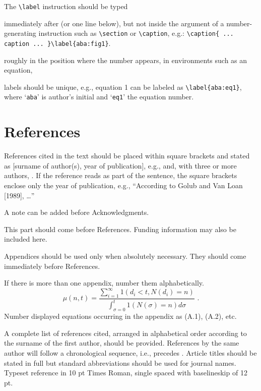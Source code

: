 \documentclass{ws-ijbc}
\begin{document}
The \verb|\label| instruction should be typed
\begin{itemlist}
\item immediately after (or one line below), but not inside the argument of
a number-generating instruction such as \verb|\section| or \verb|\caption|, e.g.:
\verb|\caption{ ... caption ... }\label{aba:fig1}|.
\item roughly in the position where the number appears, in environments
such as an equation,
\item labels should be unique, e.g., equation 1 can be labeled as
\verb|\label{aba:eq1}|, where `{\tt aba}' is author's initial and
`{\tt eq1}' the equation number.
\end{itemlist}

\section{References}
References cited in the text should be placed within square
brackets and stated as [surname of author(s), year of
publication], e.g., \cite{Golub89} and, with three
or more authors, \cite{Hall97}. If the reference reads as part of
the sentence, the square brackets enclose only the year of
publication, e.g., ``According to Golub and Van Loan [1989], \ldots''

 \noindent A note can be added before
Acknowledgments.

 \noindent This part should come
before References. Funding information may also be included here.

 \noindent Appendices should be used only
when absolutely necessary. They should come immediately before
References.

\appendix{}
If there is more than one appendix, number them alphabetically.
\begin{equation}
\mu(n, t) = \frac{\displaystyle\sum^\infty_{i=1} 1(d_i < t, N(d_i) = n)}
{\displaystyle\int^t_{\sigma=0} 1(N(\sigma) = n)d\sigma}\,\,
.\label{that}
\end{equation}
Number displayed equations occurring in the appendix as (A.1),
(A.2), etc.


\noindent A complete list of references cited, arranged in
alphabetical order according to the surname of the first author,
should be provided. References by the same author will follow a
chronological sequence, i.e., \cite{Lie00} precedes \cite{Lie01}.
Article titles should be stated in full but standard abbreviations
should be used for journal names. Typeset reference in 10 pt Times
Roman, single spaced with baselineskip of 12 pt.
\end{document}
